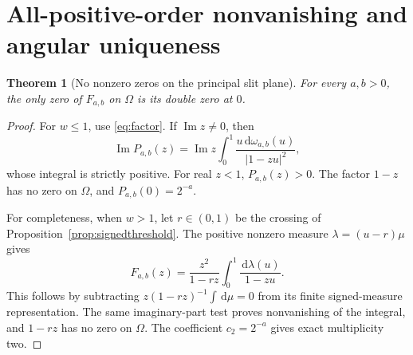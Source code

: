 \documentclass[11pt]{article}
\numberwithin{equation}{section}
\newtheorem{theorem}{Theorem}[section]
\theoremstyle{definition}
\theoremstyle{remark}
\DeclareMathOperator{\Impart}{Im}
\newcommand{\dd}{\,\mathrm d}
\newcommand{\cut}{\Omega}
\begin{document}
\section{All-positive-order nonvanishing and angular uniqueness}
\label{sec:zeros}
\begin{theorem}[No nonzero zeros on the principal slit plane]
\label{thm:zerofree}
For every $a,b>0$, the only zero of $F_{a,b}$ on $\cut$ is its double
zero at $0$.
\end{theorem}
\begin{proof}
For $w\le1$, use \eqref{eq:factor}. If $\Impart z\ne0$, then
\[
 \Impart P_{a,b}(z)
 =\Impart z\int_0^1\frac{u\dd\omega_{a,b}(u)}{|1-zu|^2},
\]
whose integral is strictly positive. For real $z<1$, $P_{a,b}(z)>0$.
The factor $1-z$ has no zero on $\cut$, and $P_{a,b}(0)=2^{-a}$.

For completeness, when $w>1$, let $r\in(0,1)$ be the crossing of
Proposition~\ref{prop:signedthreshold}. The positive nonzero measure
$\lambda=(u-r)\mu$ gives
\[
 F_{a,b}(z)=\frac{z^2}{1-rz}
           \int_0^1\frac{\dd\lambda(u)}{1-zu}.
\]
This follows by subtracting $z(1-rz)^{-1}\int\dd\mu=0$ from its
finite signed-measure representation. The same imaginary-part test
proves nonvanishing of the integral, and $1-rz$ has no zero on $\cut$.
The coefficient $c_2=2^{-a}$ gives exact multiplicity two.
\end{proof}
\end{document}
